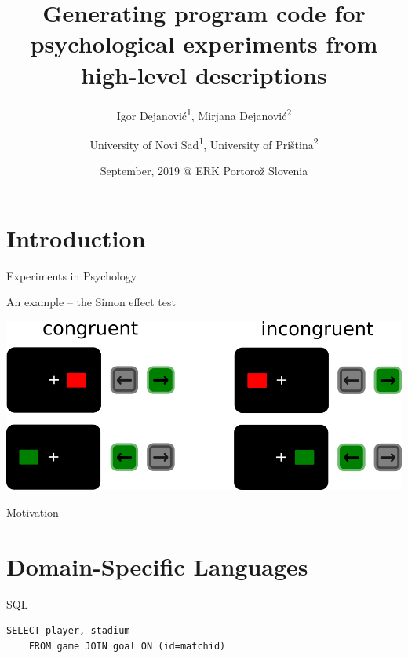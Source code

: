 \documentclass[presentation]{beamer}
\author{University of Novi Sad\textsuperscript{1}, University of Priština\textsuperscript{2}}
\date{September, 2019 @ ERK Portorož Slovenia}
\title{Generating program code for psychological experiments from high-level descriptions}
\subtitle{Igor Dejanović\textsuperscript{1}, Mirjana Dejanović\textsuperscript{2}}
\begin{document}
\maketitle

\section*{Introduction}
\label{sec:org5b711c1}
\begin{frame}[label={sec:orgb89aeac}]{}
\begin{center}\Huge{Experiments in Psychology}\end{center}
\end{frame}

\begin{frame}[label={sec:orge2e0f74}]{An example -- the Simon effect test}
\begin{center}
\includegraphics[width=1\textwidth]{./images/simon_experiment.png}
\end{center} 
\end{frame}
\begin{frame}[label={sec:org3f03a3f}]{}
\begin{center}\Huge{Motivation}\end{center}
\end{frame}

\section*{Domain-Specific Languages}
\label{sec:orge9ebbb4}
\begin{frame}[label={sec:orgcd9d010},fragile]{SQL}
 \begin{verbatim}
SELECT player, stadium
    FROM game JOIN goal ON (id=matchid)
\end{verbatim}
\end{frame}
\end{document}
